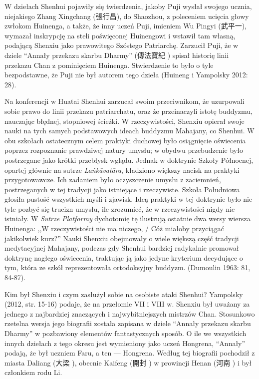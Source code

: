 W dziełach Shenhui pojawiły się twierdzenia, jakoby Puji wysłał swojego ucznia, niejakiego Zhang Xingchang (張行昌), do Shaozhou, z poleceniem ucięcia głowy zwłokom Huinenga, a także, że inny uczeń Puji, imieniem Wu Pingyi (武平一), wymazał inskrypcję na steli poświęconej Huinengowi i wstawił tam własną, podającą Shenxiu jako prawowitego Szóstego Patriarchę.
Zarzucił Puji, że w dziele ``Annały przekazu skarbu Dharmy'' (傳法寶紀 ) spisał historię linii przekazu Chan z pominięciem Huinenga.
Stwierdzenie to było o tyle bezpodstawne, że Puji nie był autorem tego dzieła
(Huineng i Yampolsky 2012: 28).

Na konferencji w Huatai Shenhui zarzucał swoim przeciwnikom, że uzurpowali sobie prawo do linii przekazu patriarchatu, oraz że przeinaczyli istotę buddyzmu, nauczając błędnej, stopniowej ścieżki.
W rzeczywistości, Shenxiu opierał swoje nauki na tych samych podstawowych ideach buddyzmu Mahajany, co Shenhui.
W obu szkołach ostatecznym celem praktyki duchowej było osiągnięcie oświecenia poprzez rozpoznanie prawdziwej natury umysłu; w obydwu przebudzenie było postrzegane jako krótki przebłysk wglądu.
Jednak w doktrynie Szkoły Północnej, opartej głównie na sutrze \textit{La\.nkā\-vatāra}, kładziono większy nacisk na praktyki przygotowawcze.
Ich zadaniem było oczyszczenie umysłu z zaciemnień, postrzeganych w tej tradycji jako istniejące i rzeczywiste.
Szkoła Południowa głosiła pustość wszystkich myśli i zjawisk.
Ideą praktyki w tej doktrynie było nie tyle pozbyć się trucizn umysłu, ile zrozumieć, że w rzeczywistości nigdy nie istniały.
W \textit{Sutrze Platformy} dychotomię tę ilustrują ostatnie dwa wersy wiersza Huinenga: ,,W rzeczywistości nie ma niczego, / Cóż miałoby przyciągać jakikolwiek kurz?'' %
Nauki Shenxiu obejmowały o wiele większą część tradycji medytacyjnej Mahajany, podczas gdy Shenhui bardziej radykalnie promował doktrynę nagłego oświecenia, traktując ją jako jedyne kryterium decydujące o tym, która ze szkół reprezentowała ortodoksyjny buddyzm.
(Dumoulin 1963: 81, 84-87). %

Kim był Shenxiu i czym zasłużył sobie na osobiste ataki Shenhui?
Yampolsky (2012, str. 15-16) podaje, że na przełomie VII i VIII w. Shenxiu był uważany za jednego z najbardziej znaczących i najwybitniejszych mistrzów Chan.
Stosunkowo rzetelna wersja jego biografii została zapisana w dziele ``Annały przekazu skarbu Dharmy'' w pozbawiony elementów fantastycznych sposób.
O ile we wszystkich innych dziełach z tego okresu jest wymieniony jako uczeń Hongrena, ``Annały'' podają, że był uczniem Faru, a ten --- Hongrena.
Według tej biografii pochodził z miasta Daliang (大梁 ), obecnie Kaifeng (開封 ) w prowincji Henan (河南 ) i był członkiem rodu Li.

